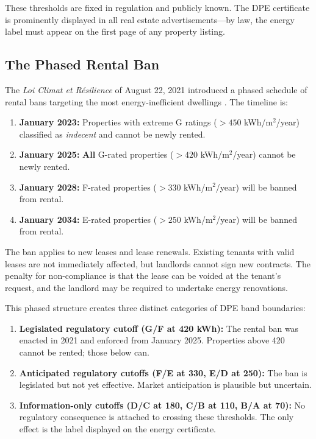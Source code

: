 \documentclass[12pt]{article}
\begin{document}
These thresholds are fixed in regulation and publicly known. The DPE certificate is prominently displayed in all real estate advertisements---by law, the energy label must appear on the first page of any property listing.

\subsection{The Phased Rental Ban}

The \textit{Loi Climat et R\'esilience} of August 22, 2021 introduced a phased schedule of rental bans targeting the most energy-inefficient dwellings \citep{ambec2024climate}. The timeline is:

\begin{enumerate}
    \item \textbf{January 2023:} Properties with extreme G ratings ($>450$ kWh/m$^2$/year) classified as \textit{indecent} and cannot be newly rented.
    \item \textbf{January 2025:} \textbf{All} G-rated properties ($>420$ kWh/m$^2$/year) cannot be newly rented.
    \item \textbf{January 2028:} F-rated properties ($>330$ kWh/m$^2$/year) will be banned from rental.
    \item \textbf{January 2034:} E-rated properties ($>250$ kWh/m$^2$/year) will be banned from rental.
\end{enumerate}

The ban applies to new leases and lease renewals. Existing tenants with valid leases are not immediately affected, but landlords cannot sign new contracts. The penalty for non-compliance is that the lease can be voided at the tenant's request, and the landlord may be required to undertake energy renovations.

This phased structure creates three distinct categories of DPE band boundaries:
\begin{enumerate}
    \item \textbf{Legislated regulatory cutoff (G/F at 420 kWh):} The rental ban was enacted in 2021 and enforced from January 2025. Properties above 420 cannot be rented; those below can.
    \item \textbf{Anticipated regulatory cutoffs (F/E at 330, E/D at 250):} The ban is legislated but not yet effective. Market anticipation is plausible but uncertain.
    \item \textbf{Information-only cutoffs (D/C at 180, C/B at 110, B/A at 70):} No regulatory consequence is attached to crossing these thresholds. The only effect is the label displayed on the energy certificate.
\end{enumerate}
\end{document}
